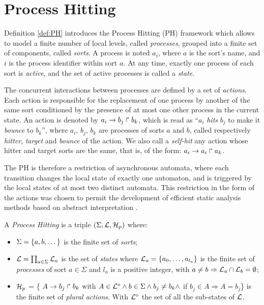 

\section{Process Hitting}
\label{sec:ph}

Definition \ref{def:PH} introduces the Process Hitting (PH) framework \cite{PMR10-TCSB}
which allows to model a finite number of local levels,
called \emph{processes},
grouped into a finite set of components, called \emph{sorts}.
A process is noted $a_i$, where $a$ is the sort's name,
and $i$ is the process identifier within sort $a$.
At any time, exactly one process of each sort is \emph{active},
and the set of active processes is called a \emph{state}.

The concurrent interactions between processes are defined by a set of \emph{actions}.
Each action is responsible for the replacement of one process by another of the same sort
conditioned by the presence of at most one other process in the current state.
An action is denoted by $a_i\rightarrow b_j\Rsh b_k$, which is read as
“$a_i$ \emph{hits} $b_j$ to make it \emph{bounce} to $b_k$”,
where $a_i$, $b_j$, $b_k$ are processes of sorts $a$ and $b$,
called respectively \emph{hitter}, \emph{target} and
\emph{bounce} of the action.
We also call a \emph{self-hit} any action whose hitter and target sorts are the same,
that is, of the form: $a_i\rightarrow a_i\Rsh a_k$.

The PH is therefore a restriction of asynchronous automata, where each transition
changes the local state of exactly one automaton,
and is triggered by the local states of at most two distinct automata.
This restriction in the form of the actions was chosen to permit
the development of efficient static analysis methods
based on abstract interpretation \cite{PMR12-MSCS}.

\begin{definition}\label{def:PH}
  A \emph{Process Hitting} is a triple $(\Sigma,\mathcal{L},\mathcal{H}_p)$ where:
  \begin{itemize}
    \item  $\Sigma = \{a,b,\dots\}$ is the finite set of \emph{sorts};
    \item  $\mathcal{L} = \prod_{a\in\Sigma} \mathcal{L}_a$ is the set of \emph{states} where
      $\mathcal{L}_a = \{a_0,\dots,a_{l_a}\}$
      is the finite set of \emph{processes} of sort $a\in\Sigma$
      and $l_a$ is a positive integer, with $a\neq b\Rightarrow \mathcal{L}_a \cap \mathcal{L}_b = \emptyset$;
    \item $\mathcal{H}_p$ = \{ $A\rightarrow b_j\Rsh b_k$ with $A \in \mathcal{L}^{\diamond} \wedge b \in \Sigma \wedge b_j \neq b_k \wedge$ if $b_j \in A \Rightarrow A=b_j$\} is the finite set of \emph{plural actions}.
    With $\mathcal{L}^{\diamond}$ the set of all the sub-states of $\mathcal{L}$.    
  \end{itemize}
\end{definition}

